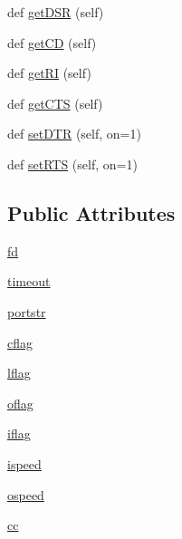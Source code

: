 \begin{DoxyCompactItemize}
def \hyperlink{classserial_1_1serialposix_1_1_serial_a57e9653fd015ed93828b30d5b49cbd3f}{get\+D\+SR} (self)
\item 
def \hyperlink{classserial_1_1serialposix_1_1_serial_a2aeffab249e4dc25a057dea3b230bace}{get\+CD} (self)
\item 
def \hyperlink{classserial_1_1serialposix_1_1_serial_acff059787425ed0fc35c0a0c4eab4625}{get\+RI} (self)
\item 
def \hyperlink{classserial_1_1serialposix_1_1_serial_a92cecef1b2ae69b2fe10ab9b2587fe68}{get\+C\+TS} (self)
\item 
def \hyperlink{classserial_1_1serialposix_1_1_serial_a3e92c36a98925f95bda3459c0177541c}{set\+D\+TR} (self, on=1)
\item 
def \hyperlink{classserial_1_1serialposix_1_1_serial_ab03e201a228ec2a7f2585c35d2272785}{set\+R\+TS} (self, on=1)
\end{DoxyCompactItemize}
\subsection*{Public Attributes}
\begin{DoxyCompactItemize}
\item 
\hyperlink{classserial_1_1serialposix_1_1_serial_aaaf5c903fd97c0e4b26a3a224c4acdba}{fd}
\item 
\hyperlink{classserial_1_1serialposix_1_1_serial_aa08e7c9fd4c836a7d33bd5bf1a50dfc5}{timeout}
\item 
\hyperlink{classserial_1_1serialposix_1_1_serial_a4fa822f75d7ff9f401b0719cfb39a3df}{portstr}
\item 
\hyperlink{classserial_1_1serialposix_1_1_serial_aae15d7b931057e36ebd3172d4a09b728}{cflag}
\item 
\hyperlink{classserial_1_1serialposix_1_1_serial_af782e542442f6e792c24de466ada7220}{lflag}
\item 
\hyperlink{classserial_1_1serialposix_1_1_serial_aea060f4346acff44b003f6ffddb9f3e5}{oflag}
\item 
\hyperlink{classserial_1_1serialposix_1_1_serial_ac238b6aaf4c4b4169b99e3b1969aa710}{iflag}
\item 
\hyperlink{classserial_1_1serialposix_1_1_serial_af1fa3027b5be88371748e984a1dd766d}{ispeed}
\item 
\hyperlink{classserial_1_1serialposix_1_1_serial_aa3f8581e533b027cc6f6c638cd67d039}{ospeed}
\item 
\hyperlink{classserial_1_1serialposix_1_1_serial_acd887a620112faa02ffe52581e62070c}{cc}
\end{DoxyCompactItemize}


